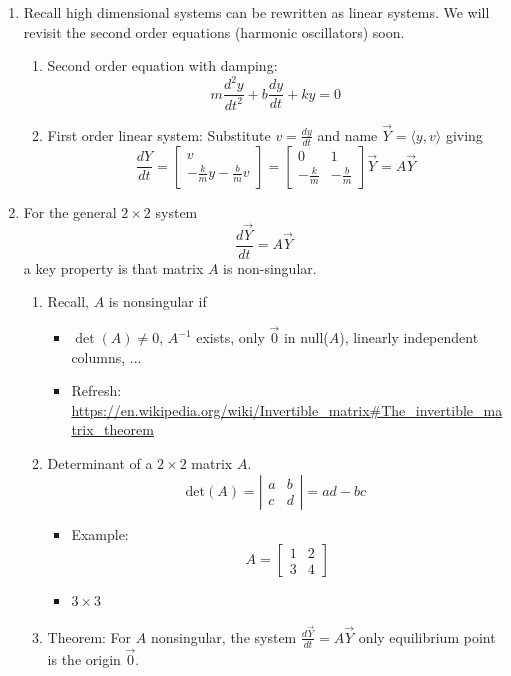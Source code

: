 \documentclass{article}
\begin{document}
\begin{enumerate}
\item Recall high dimensional systems can be rewritten as linear systems. We will revisit the second order equations (harmonic oscillators) soon.
\begin{enumerate}
\item Second order equation with damping:
\[
m \frac{d^2y}{dt^2} + b \frac{dy}{dt} + ky = 0
\]
\item First order linear system:
Substitute $v = \frac{dy}{dt}$ and name $\vec{Y} = \langle y, v \rangle$ giving
\[
\frac{dY}{dt}=
\begin{bmatrix}
v \\
-\frac{k}{m}y - \frac{b}{m}v
\end{bmatrix}
= \begin{bmatrix}
0 & 1 \\
-\frac{k}{m} & - \frac{b}{m} 
\end{bmatrix}
\vec{Y} = A\vec{Y}
\]
\end{enumerate}

\item For the general $2 \times 2$ system
\[
\frac{d\vec{Y}}{dt} = A \vec{Y}
\]
a key property is that matrix $A$ is non-singular.
\begin{enumerate}
\item Recall, $A$ is nonsingular if 
\begin{itemize}
\item $\det(A)\neq 0$, $A^{-1}$ exists, only $\vec{0}$ in null($A$), linearly independent columns, ...
\item Refresh: \url{https://en.wikipedia.org/wiki/Invertible_matrix#The_invertible_matrix_theorem}
\end{itemize}
\item Determinant of a $2\times 2$ matrix $A$.
\[
\text{det}(A) = \left|
\begin{array}{cc}
a & b \\
c & d 
\end{array}
\right|
= ad-bc
\]
\begin{itemize}
\item Example: 
\[
A = 
\begin{bmatrix}
1 & 2 \\
3 & 4
\end{bmatrix}
\]
\item $3 \times 3$
\end{itemize}
\item Theorem: For $A$ nonsingular, the system $\frac{d\vec{Y}}{dt} = A \vec{Y}$ only equilibrium point is the origin $\vec{0}$.
\end{enumerate}


\end{enumerate}
\end{document}

